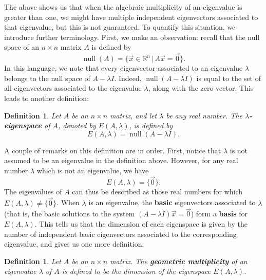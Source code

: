\documentclass[12pt,letterpaper]{article}
\newtheorem{definition}[theorem]{Definition}
\newcommand{\R}{\mathbb{R}}
\begin{document}
The above shows us that when the algebraic multiplicity of an eigenvalue is greater than one, we might have multiple independent eigenvectors associated to that eigenvalue, but this is not guaranteed. To quantify this situation, we introduce further terminology. First, we make an observation: recall that the null space of an $n\times n$ matrix $A$ is defined by
\[
 \operatorname{null}(A) = \{\vec{x}\in\R^n \,|\, A\vec{x}=\vec{0}\}.
\]
In this language, we note that every eigenvector associated to an eigenvalue $\lambda$ belongs to the null space of $A-\lambda I$. Indeed, $\operatorname{null}(A-\lambda I)$ is equal to the set of all eigenvectors associated to the eigenvalue $\lambda$, along with the zero vector. This leads to another definition:
\begin{definition}
 Let $A$ be an $n\times n$ matrix, and let $\lambda$ be any real number. The \textbf{$\lambda$-eigenspace} of $A$, denoted by $E(A,\lambda)$, is defined by
\[
 E(A,\lambda) = \operatorname{null}(A-\lambda I).
\]
\end{definition}
A couple of remarks on this definition are in order. First, notice that $\lambda$ is not assumed to be an eigenvalue in the definition above. However, for any real number $\lambda$ which is not an eigenvalue, we have
\[
 E(A,\lambda) = \{\vec{0}\}.
\]
The eigenvalues of $A$ can thus be described as those real numbers for which $E(A,\lambda)\neq \{\vec{0}\}$. When $\lambda$ is an eigenvalue, the \textbf{basic} eigenvectors associated to $\lambda$ (that is, the basic solutions to the system $(A-\lambda I)\vec{x}=\vec{0}$) form a \textbf{basis} for $E(A,\lambda)$. This tells us that the dimension of each eigenspace is given by the number of independent basic eigenvectors associated to the corresponding eigenvalue, and gives us one more definition:
\begin{definition}
 Let $A$ be an $n\times n$ matrix. The \textbf{geometric multiplicity} of an eigenvalue $\lambda$ of $A$ is defined to be the dimension of the eigenspace $E(A,\lambda)$.
\end{definition}
\end{document}
